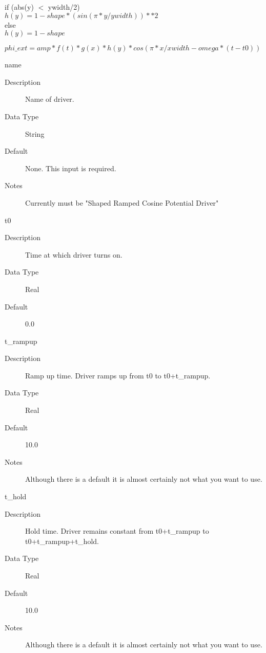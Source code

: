 \documentclass[11pt]{amsart}
\begin{document}
\noindent if (abs(y) $<$ ywidth/2) \\
\indent \begin{math} h(y) = 1-shape*(sin(\pi*y/ywidth))**2 \end{math} \\
else \\
\indent \begin{math} h(y) = 1-shape \end{math}

\noindent \begin{math}phi\_ext = amp*f(t)*g(x)*h(y)*cos(\pi*x/xwidth-omega*(t-t0)) \end{math}

name
\begin{description}
\item [Description] Name of driver.
\item [Data Type] String
\item [Default] None.  This input is required.
\item [Notes] Currently must be "Shaped Ramped Cosine Potential Driver"
\end{description}

t0
\begin{description}
\item [Description] Time at which driver turns on.
\item [Data Type] Real
\item [Default] 0.0
\end{description}

t\_rampup
\begin{description}
\item [Description] Ramp up time.  Driver ramps up from t0 to t0+t\_rampup.
\item [Data Type] Real
\item [Default] 10.0
\item [Notes] Although there is a default it is almost certainly not what you
want to use.
\end{description}

t\_hold
\begin{description}
\item [Description] Hold time.  Driver remains constant from t0+t\_rampup to \\
t0+t\_rampup+t\_hold.
\item [Data Type] Real
\item [Default] 10.0
\item [Notes] Although there is a default it is almost certainly not what you
want to use.
\end{description}
\end{document}
